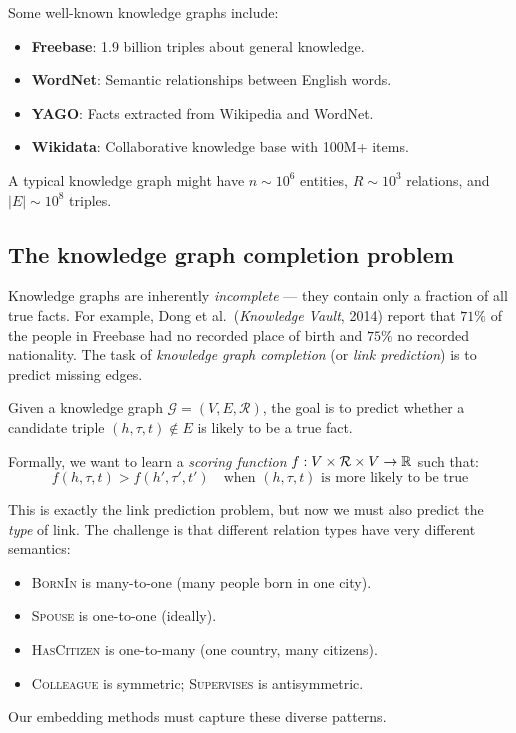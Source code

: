 \begin{notechapter}
\begin{example}
Some well-known knowledge graphs include:
\begin{itemize}
    \item \textbf{Freebase}: 1.9 billion triples about general knowledge.
    \item \textbf{WordNet}: Semantic relationships between English words.
    \item \textbf{YAGO}: Facts extracted from Wikipedia and WordNet.
    \item \textbf{Wikidata}: Collaborative knowledge base with 100M+ items.
\end{itemize}
A typical knowledge graph might have $n \sim 10^6$ entities, $R \sim 10^3$ relations, and $|E| \sim 10^8$ triples.
\end{example}

\subsection{The knowledge graph completion problem}

\begin{intuition}[Motivation]
Knowledge graphs are inherently \emph{incomplete} --- they contain only a fraction of all true facts. For example, Dong et al.\ (\emph{Knowledge Vault}, 2014) report that $71\%$ of the people in Freebase had no recorded place of birth and $75\%$ no recorded nationality. The task of \emph{knowledge graph completion} (or \emph{link prediction}) is to predict missing edges.
\end{intuition}

\begin{definition}
Given a knowledge graph $\mathcal{G} = (V, E, \mathcal{R})$, the goal is to predict whether a candidate triple $(h, \tau, t) \notin E$ is likely to be a true fact.

Formally, we want to learn a \emph{scoring function} $f: V \times \mathcal{R} \times V \to \mathbb{R}$ such that:
\[
f(h, \tau, t) > f(h', \tau', t') \quad \text{when } (h, \tau, t) \text{ is more likely to be true}
\]
\end{definition}

\begin{intuition}
This is exactly the link prediction problem, but now we must also predict the \emph{type} of link. The challenge is that different relation types have very different semantics:
\begin{itemize}
    \item \textsc{BornIn} is many-to-one (many people born in one city).
    \item \textsc{Spouse} is one-to-one (ideally).
    \item \textsc{HasCitizen} is one-to-many (one country, many citizens).
    \item \textsc{Colleague} is symmetric; \textsc{Supervises} is antisymmetric.
\end{itemize}
Our embedding methods must capture these diverse patterns.
\end{intuition}


\end{notechapter}
